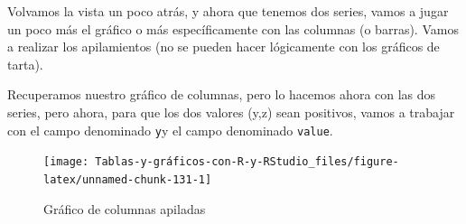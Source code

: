 \documentclass[
]{book}
\newenvironment{Shaded}{\begin{snugshade}}{\end{snugshade}}
\newcommand{\AttributeTok}[1]{\textcolor[rgb]{0.77,0.63,0.00}{#1}}
\newcommand{\CommentTok}[1]{\textcolor[rgb]{0.56,0.35,0.01}{\textit{#1}}}
\newcommand{\ConstantTok}[1]{\textcolor[rgb]{0.00,0.00,0.00}{#1}}
\newcommand{\FunctionTok}[1]{\textcolor[rgb]{0.00,0.00,0.00}{#1}}
\newcommand{\NormalTok}[1]{#1}
\newcommand{\OtherTok}[1]{\textcolor[rgb]{0.56,0.35,0.01}{#1}}
\newcommand{\SpecialCharTok}[1]{\textcolor[rgb]{0.00,0.00,0.00}{#1}}
\newcommand{\StringTok}[1]{\textcolor[rgb]{0.31,0.60,0.02}{#1}}
\begin{document}
Volvamos la vista un poco atrás, y ahora que tenemos dos series, vamos a jugar un poco más el gráfico o más específicamente
con las columnas (o barras). Vamos a realizar los apilamientos (no se pueden hacer lógicamente con los gráficos de tarta).

Recuperamos nuestro gráfico de columnas, pero lo hacemos ahora con las dos series, pero ahora, para que los dos valores (y,z) sean positivos, vamos a trabajar con el campo denominado \texttt{y}y el campo denominado \texttt{value}.

\begin{Shaded}
\end{Shaded}

\begin{figure}[H]

{\centering \texttt{[image: Tablas-y-gráficos-con-R-y-RStudio\_files/figure-latex/unnamed-chunk-131-1]} 

}

\caption{Gráfico de columnas apiladas}\label{fig:unnamed-chunk-131}
\end{figure}
\end{document}
